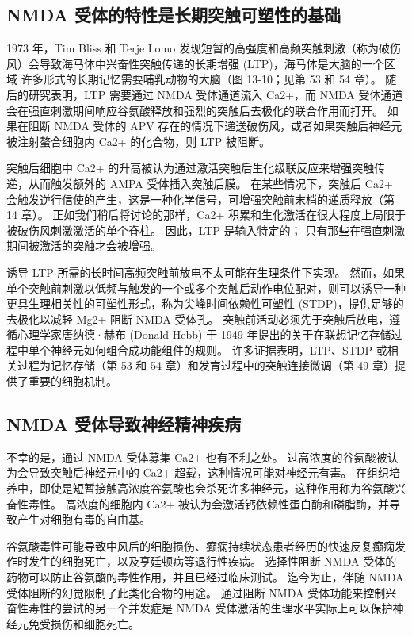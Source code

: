 \subsection{NMDA 受体的特性是长期突触可塑性的基础}
1973 年，Tim Bliss 和 Terje Lomo 发现短暂的高强度和高频突触刺激（称为破伤风）会导致海马体中兴奋性突触传递的长期增强 (LTP)，海马体是大脑的一个区域 许多形式的长期记忆需要哺乳动物的大脑（图 13-10；见第 53 和 54 章）。 随后的研究表明，LTP 需要通过 NMDA 受体通道流入 Ca2+，而 NMDA 受体通道会在强直刺激期间响应谷氨酸释放和强烈的突触后去极化的联合作用而打开。 如果在阻断 NMDA 受体的 APV 存在的情况下递送破伤风，或者如果突触后神经元被注射螯合细胞内 Ca2+ 的化合物，则 LTP 被阻断。

突触后细胞中 Ca2+ 的升高被认为通过激活突触后生化级联反应来增强突触传递，从而触发额外的 AMPA 受体插入突触后膜。 在某些情况下，突触后 Ca2+ 会触发逆行信使的产生，这是一种化学信号，可增强突触前末梢的递质释放（第 14 章）。 正如我们稍后将讨论的那样，Ca2+ 积累和生化激活在很大程度上局限于被破伤风刺激激活的单个脊柱。 因此，LTP 是输入特定的； 只有那些在强直刺激期间被激活的突触才会被增强。

诱导 LTP 所需的长时间高频突触前放电不太可能在生理条件下实现。 然而，如果单个突触前刺激以低频与触发的一个或多个突触后动作电位配对，则可以诱导一种更具生理相关性的可塑性形式，称为尖峰时间依赖性可塑性 (STDP)，提供足够的去极化以减轻 Mg2+ 阻断 NMDA 受体孔。 突触前活动必须先于突触后放电，遵循心理学家唐纳德·赫布 (Donald Hebb) 于 1949 年提出的关于在联想记忆存储过程中单个神经元如何组合成功能组件的规则。 许多证据表明，LTP、STDP 或相关过程为记忆存储（第 53 和 54 章）和发育过程中的突触连接微调（第 49 章）提供了重要的细胞机制。

\subsection{NMDA 受体导致神经精神疾病}
不幸的是，通过 NMDA 受体募集 Ca2+ 也有不利之处。 过高浓度的谷氨酸被认为会导致突触后神经元中的 Ca2+ 超载，这种情况可能对神经元有毒。 在组织培养中，即使是短暂接触高浓度谷氨酸也会杀死许多神经元，这种作用称为谷氨酸兴奋性毒性。 高浓度的细胞内 Ca2+ 被认为会激活钙依赖性蛋白酶和磷脂酶，并导致产生对细胞有毒的自由基。

谷氨酸毒性可能导致中风后的细胞损伤、癫痫持续状态患者经历的快速反复癫痫发作时发生的细胞死亡，以及亨廷顿病等退行性疾病。 选择性阻断 NMDA 受体的药物可以防止谷氨酸的毒性作用，并且已经过临床测试。 迄今为止，伴随 NMDA 受体阻断的幻觉限制了此类化合物的用途。 通过阻断 NMDA 受体功能来控制兴奋性毒性的尝试的另一个并发症是 NMDA 受体激活的生理水平实际上可以保护神经元免受损伤和细胞死亡。

